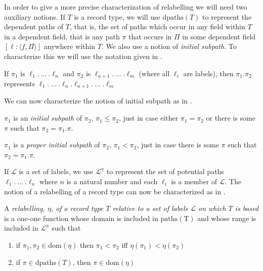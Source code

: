 \begin{shaded}
In order to give a more precise characterization of relabelling we
will need two auxiliary notions.  If $T$ is a record type, we will use
$\mathrm{dpaths}(T)$ to represent the dependent paths of $T$, that is,
the set of paths which occur in any field within $T$ in a dependent
field, that is any path $\pi$ that occurs in $\Pi$ in some dependent
field $[\ell:\langle f,\Pi\rangle]$ anywhere within $T$.  We also use
a notion of \textit{initial subpath}.  To characterize this we will
use the notation given in \nexteg{}.
\begin{ex} 
If $\pi_1$ is $\ell_1.\ \ldots\ .\ell_n$ and $\pi_2$ is
$\ell_{n+1}.\ \ldots\ .\ell_m$ (where all $\ell_i$ are labels), then
$\pi_1.\pi_2$ represents $\ell_1.\ \ldots\ .\ell_n.\ell_{n+1}.\
\ldots\ .\ell_m$ 
\end{ex}
We can now characterize the notion of initial subpath as in \nexteg{}.
\begin{ex}
  \begin{subex}
  \item $\pi_1$ is an \textit{initial subpath} of $\pi_2$,
    $\pi_1\leq\pi_2$, just in case either $\pi_1=\pi_2$ or there is
    some $\pi$ such that $\pi_2=\pi_1.\pi$.
    
  \item $\pi_1$ is a \textit{proper initial subpath} of $\pi_2$,
    $\pi_1<\pi_2$, just in case there is
    some $\pi$ such that $\pi_2=\pi_1.\pi$.
  \end{subex}
  
\end{ex}

If $\mathcal{L}$ is a set of labels, we use $\mathcal{L}^\pi$ to
represent the set of potential paths $\ell_1.\ \ldots\ .\ell_n$ where
$n$ is a natural number and each $\ell_i$ is a member of $\mathcal{L}$. The notion of a relabelling of a record type can now be characterized
as in \nexteg{}.
\begin{ex} 
A \textit{relabelling, $\eta$, of a record type $T$ relative to a set of
  labels $\mathcal{L}$ on which $T$ is based} is a one-one function whose
domain is included in $\mathrm{paths(T)}$ and whose range is included
in $\mathcal{L}^\pi$ such that
\begin{enumerate} 
 
\item if $\pi_1,\pi_2\in\mathrm{dom}(\eta)$ then $\pi_1<\pi_2$ iff $\eta(\pi_1)<\eta(\pi_2)$ 
 
\item if $\pi\in\mathrm{dpaths}(T)$, then $\pi\in\mathrm{dom}(\eta)$


\end{enumerate}
\end{ex}
\end{shaded}
